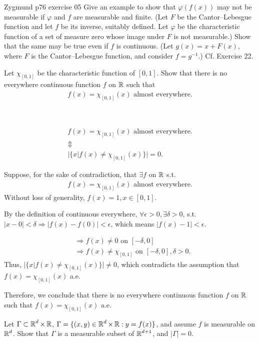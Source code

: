 \documentclass[UTF8,a4paper,10pt]{article}
\begin{document}
  \begin{Problem}[]{Zygmund p76 exercise 05}
    Give an example to show that $\varphi(f(x))$ may not be measurable if $\varphi$ and $f$ are measurable and finite. (Let $F$ be the Cantor–Lebesgue function and let $f$ be its inverse, suitably defined. Let $\varphi$ be the characteristic function of a set of measure zero whose image under $F$ is not measurable.) Show that the same may be true even if $f$ is continuous. (Let $g(x) = x + F(x)$, where $F$ is the Cantor–Lebesgue function, and consider $f = g^{-1}$.) Cf. Exercise 22.

  \end{Problem}

 
\begin{Problem}[]{}

  Let \(\chi_{[0,1]} \) be the characteristic function of \([0,1]\). Show that there is no everywhere continuous function \(f\) on \(\operatorname{\mathbb{R}}\) such that
\begin{equation*}
  \begin{aligned}
    f(x) = \chi_{[0,1]} (x) \,\,\text{almost everywhere.}
  \end{aligned}
\end{equation*}
\end{Problem}

\begin{solution}\,

  \begin{gather*}
    f(x) = \chi_{[0,1]}(x) \text{ almost everywhere.} \\
    \Updownarrow \\
    |\{x | f(x) \neq \chi_{[0,1]}(x)\}| = 0.
  \end{gather*}

\dotfill

  Suppose, for the sake of contradiction, that \(\exists f\) on \(\operatorname{\mathbb{R}}\) s.t. 
  \begin{gather*}
    f(x) = \chi_{[0,1]}(x) \text{ almost everywhere.}
  \end{gather*}
  Without loss of generality, \(f(x) = 1, x\in [0,1]\).

  By the definition of continuous everywhere,
  \(\forall \epsilon>0, \exists \delta>0\), s.t. \(|x-0|<\delta \Rightarrow |f(x)-f(0)|<\epsilon\), which means \(|f(x)-1|<\epsilon\).

  \begin{align*}
    &\Rightarrow f(x) \neq 0 \text{ on } [-\delta, 0] \\
    &\Rightarrow f(x) \neq \chi_{[0,1]} \text{ on } [-\delta, 0], \delta>0.
\end{align*}
Thus, \(|\{x | f(x) \neq \chi_{[0,1]}(x)\}| \neq 0\), which contradicts the assumption that \(f(x) = \chi_{[0,1]}(x) \) a.e.

Therefore, we conclude that there is no everywhere continuous function \(f\) on \(\operatorname{\mathbb{R}}\) such that \(f(x) = \chi_{[0,1]}(x) \) a.e.

\end{solution}

\begin{Problem}[]{}
  Let \(\Gamma\subset \operatorname{\mathbb{R}}^d \times\operatorname{\mathbb{R}}\), \(\Gamma = \{(x,y)\in\operatorname{\mathbb{R}}^d\times\operatorname{\mathbb{R}}:y = f(x)\}\), and assume \(f\) is measurable on \(\operatorname{\mathbb{R}}^d\). Show that \(\Gamma\) is a measurable subset of \(\operatorname{\mathbb{R}}^{d+1}\), and \(|\Gamma| = 0.\)
\end{Problem}
\end{document}
